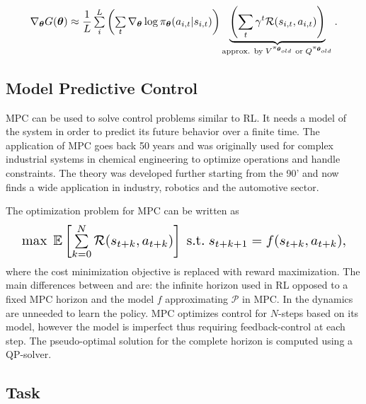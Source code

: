 \documentclass[letterpaper,conference,10pt]{IEEEconf}
\begin{document}
\begin{equation}
    \label{eq:policy_update}
    \resizebox{.9\hsize}{!}{$
    \nabla_{\boldsymbol{\theta}} G(\boldsymbol{\theta})\approx \dfrac{1}{L}\sum\limits_i^L \left(\sum\limits_{t} \nabla_{\boldsymbol{\theta}} \log\pi_{\boldsymbol{\theta}}(a_{i,t}\vert s_{i,t})\right) \underbrace{\left(\sum\limits_{t}\gamma^t \mathcal{R}(s_{i,t}, a_{i,t})\right)}_{\text{approx. by} \; V^{\pi_{\boldsymbol{\theta}_{old}}} \; \text{or} \; Q^{\pi_{\boldsymbol{\theta}_{old}}}}.
    $}
\end{equation}

\subsection{Model Predictive Control}

MPC can be used to solve control problems similar to RL. It needs a model of the system in order to predict its future behavior over a finite time. The application of MPC goes back 50 years and was originally used for complex industrial systems in chemical engineering to optimize operations and handle constraints. The theory was developed further starting from the 90' \cite{mayne_receding_1990} and now finds a wide application in industry, robotics and the automotive sector.

The optimization problem for MPC can be written as
\begin{equation}
    \label{eq:mpc}
    \resizebox{.95\hsize}{!}{$
    \max \;\mathbb{E}\left[\sum\limits^N_{k=0}\mathcal{R}(s_{t+k}, a_{t+k})\right] \; \text{s.t.} \; s_{t+k+1} = f(s_{t+k}, a_{t+k}),
    $}
\end{equation}
where the cost minimization objective is replaced with reward maximization. The main differences between  and  are: the infinite horizon used in RL opposed to a fixed MPC horizon and the model $f$ approximating $\mathcal{P}$ in MPC. In  the dynamics are unneeded to learn the policy. MPC optimizes control for $N$-steps based on its model, however the model is imperfect thus requiring feedback-control at each step. The pseudo-optimal solution for the complete horizon is computed using a QP-solver.

\subsection{Task}
\end{document}
